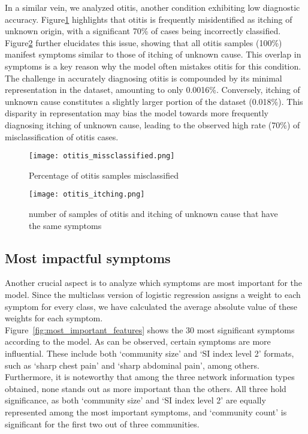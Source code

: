 In a similar vein, we analyzed otitis, another condition exhibiting low diagnostic accuracy.
Figure\ref{fig:otitis_missclassified} highlights that otitis is frequently misidentified as itching of unknown origin,
with a significant 70\% of cases being incorrectly classified.\\
Figure\ref{fig:otitis_itching} further elucidates this issue,
showing that all otitis samples (100\%) manifest symptoms similar to those of itching of unknown cause.
This overlap in symptoms is a key reason why the model often mistakes otitis for this condition.\\
The challenge in accurately diagnosing otitis is compounded by its minimal representation in the dataset, amounting to only 0.0016\%.
Conversely, itching of unknown cause constitutes a slightly larger portion of the dataset (0.018\%).
This disparity in representation may bias the model towards more frequently diagnosing itching of unknown cause,
leading to the observed high rate (70\%) of misclassification of otitis cases.
\begin{figure}[H]
	\centering
	\texttt{[image: otitis\_missclassified.png]}
	\caption{Percentage of otitis samples misclassified}\label{fig:otitis_missclassified}
\end{figure}
\noindent
\begin{figure}[H]
	\centering
	\texttt{[image: otitis\_itching.png]}
	\caption{number of samples of otitis and itching of unknown cause that have the same symptoms}\label{fig:otitis_itching}
\end{figure}
\noindent

\subsection*{Most impactful symptoms}
Another crucial aspect is to analyze which symptoms are most important for the model.
Since the multiclass version of logistic regression assigns a weight to each symptom for every class,
we have calculated the average absolute value of these weights for each symptom.\\
Figure~\ref{fig:most_important_features} shows the 30 most significant symptoms according to the model.
As can be observed, certain symptoms are more influential. These include both `community size' and `SI index level 2' formats,
such as `sharp chest pain' and `sharp abdominal pain', among others.\\
Furthermore, it is noteworthy that among the three network information types obtained,
none stands out as more important than the others. All three hold significance,
as both `community size' and `SI index level 2' are equally represented among the most important symptoms,
and `community count' is significant for the first two out of three communities.

